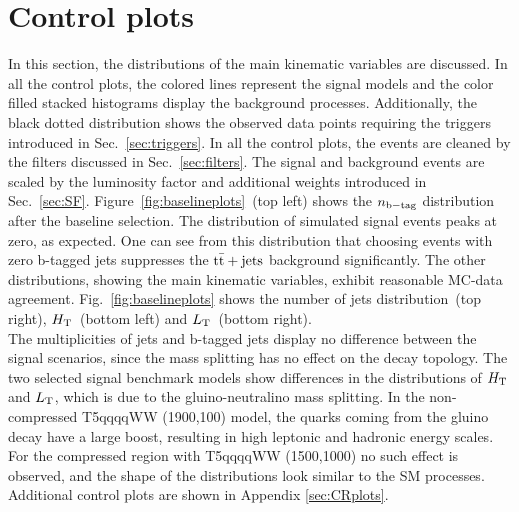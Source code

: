 \section{Control plots}
In this section, the distributions of the main kinematic variables are discussed. In all the control plots, the colored lines represent the signal models and the color filled stacked histograms display the background processes. Additionally, the black dotted distribution shows the observed data points requiring the triggers introduced in Sec.~\ref{sec:triggers}. In all the control plots, the events are cleaned by the filters discussed in Sec.~\ref{sec:filters}. The signal and background events are scaled by the luminosity factor and additional weights introduced in Sec.~\ref{sec:SF}. Figure~\ref{fig:baselineplots}~(top left) shows the $n_{\rm b-tag}$ distribution after the baseline selection. The distribution of simulated signal events peaks at zero, as expected. One can see from this distribution that choosing events with zero b-tagged jets suppresses the ${\rm t\bar{t}+jets}$ background significantly. The other distributions, showing the main kinematic variables, exhibit reasonable MC-data agreement. Fig.~\ref{fig:baselineplots} shows the number of jets distribution~(top right), $H_{\rm T}$~(bottom left) and $L_{\rm T}$~(bottom right). \\
The multiplicities of jets and b-tagged jets display no difference between the signal scenarios, since the mass splitting has no effect on the decay topology. 
The two selected signal benchmark models show differences in the distributions of $H_{\rm T}$ and $L_{\rm T}$, which is due to the gluino-neutralino mass splitting. In the non-compressed T5qqqqWW (1900,100) model, the quarks coming from the gluino decay have a large boost, resulting in high leptonic and hadronic energy scales. For the compressed region with T5qqqqWW (1500,1000) no such effect is observed, and the shape of the distributions look similar to the SM processes. \\
Additional control plots are shown in Appendix \ref{sec:CRplots}.
